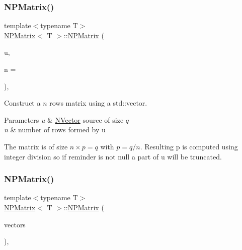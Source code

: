 \subsubsection{\texorpdfstring{NPMatrix()}{NPMatrix()}\hspace{0.1cm}{\footnotesize\ttfamily [5/7]}}
{\footnotesize\ttfamily template$<$typename T$>$ \\
\mbox{\hyperlink{class_n_p_matrix}{N\+P\+Matrix}}$<$ T $>$\+::\mbox{\hyperlink{class_n_p_matrix}{N\+P\+Matrix}} (\begin{DoxyParamCaption}\item[{const \mbox{\hyperlink{class_n_vector}{N\+Vector}}$<$ T $>$ \&}]{u,  }\item[{\mbox{\hyperlink{typedef_8h_a1b140a2034db3f5dfe18a987745df43a}{ul\+\_\+t}}}]{n = {} }\end{DoxyParamCaption})\hspace{0.3cm}{\ttfamily [inline]}, {\ttfamily [explicit]}}



Construct a $ n $ rows matrix using a {\ttfamily std\+::vector}. 


\begin{DoxyParams}{Parameters}
{\em u} & {\ttfamily \mbox{\hyperlink{class_n_vector}{N\+Vector}}} source of size $ q $ \\
\hline
{\em n} & number of rows formed by u\\
\hline
\end{DoxyParams}
The matrix is of size $ n \times p = q $ with $ p = q / n $. Resulting {\ttfamily p} is computed using integer division so if reminder is not null a part of {\ttfamily u} will be truncated. \mbox{\label{class_n_p_matrix_a844e2c006a3e53ea0d07a35bbe5ffd4e}} 
\subsubsection{\texorpdfstring{NPMatrix()}{NPMatrix()}\hspace{0.1cm}{\footnotesize\ttfamily [6/7]}}
{\footnotesize\ttfamily template$<$typename T$>$ \\
\mbox{\hyperlink{class_n_p_matrix}{N\+P\+Matrix}}$<$ T $>$\+::\mbox{\hyperlink{class_n_p_matrix}{N\+P\+Matrix}} (\begin{DoxyParamCaption}\item[{const vector$<$ \mbox{\hyperlink{class_n_vector}{N\+Vector}}$<$ T $>$ $>$ \&}]{vectors }\end{DoxyParamCaption})\hspace{0.3cm}{\ttfamily [inline]}, {\ttfamily [explicit]}}



